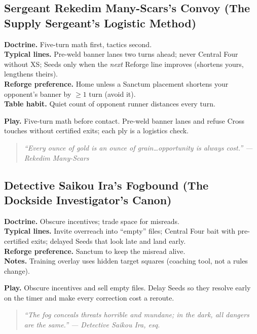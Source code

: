 \documentclass[11pt]{article}
\providecommand{\playdesc}[1]{\par\smallskip\noindent\small\textbf{Play.} #1\par}
\begin{document}
\subsection*{Sergeant Rekedim Many-Scars's Convoy (The Supply Sergeant's Logistic Method)}
\textbf{Doctrine.} Five-turn math first, tactics second.\\
\textbf{Typical lines.} Pre-weld banner lanes two turns ahead; never Central Four without XS; Seeds only when the \emph{next} Reforge line improves (shortens yours, lengthens theirs).\\
\textbf{Reforge preference.} Home unless a Sanctum placement shortens your opponent's banner by $\geq1$ turn (avoid it).\\
\textbf{Table habit.} Quiet count of opponent runner distances every turn.
\playdesc{Five-turn math before contact. Pre-weld banner lanes and refuse Cross touches without certified exits; each ply is a logistics check.}
\begin{quote}\small\itshape
``Every ounce of gold is an ounce of grain\dots opportunity is always cost.'' --- Rekedim Many-Scars
\end{quote}

\subsection*{Detective Saikou Ira's Fogbound (The Dockside Investigator's Canon)}
\textbf{Doctrine.} Obscure incentives; trade space for misreads.\\
\textbf{Typical lines.} Invite overreach into ``empty'' files; Central Four bait with pre-certified exits; delayed Seeds that look late and land early.\\
\textbf{Reforge preference.} Sanctum to keep the misread alive.\\
\textbf{Notes.} Training overlay uses hidden target squares (coaching tool, not a rules change).
\playdesc{Obscure incentives and sell empty files. Delay Seeds so they resolve early on the timer and make every correction cost a reroute.}
\begin{quote}\small\itshape
``The fog conceals threats horrible and mundane; in the dark, all dangers are the same.'' --- Detective Saikou Ira, esq.
\end{quote}

\end{document}
